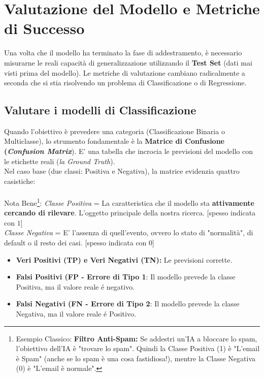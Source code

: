 \documentclass{article}
\begin{document}
\section{Valutazione del Modello e Metriche di Successo}
Una volta che il modello ha terminato la fase di addestramento, è necessario misurarne le reali capacità di generalizzazione utilizzando il \textbf{Test Set} (dati mai visti prima del modello). Le metriche di valutazione cambiano radicalmente a seconda che si stia risolvendo un problema di Classificazione o di Regressione.

\subsection{Valutare i modelli di Classificazione}
Quando l'obiettivo è prevedere una categoria (Classificazione Binaria o Multiclasse), lo strumento fondamentale è la \textbf{Matrice di Confusione (\textit{Confusion Matrix}}). E' una tabella che incrocia le previsioni del modello con le etichette reali (\textit{la Ground Truth}).\\
Nel caso base (due classi: Positiva e Negativa), la matrice evidenzia quattro casistiche: \\
\\
Nota Bene\footnote{Esempio Classico: \textbf{Filtro Anti-Spam: }Se addestri un'IA a bloccare lo spam, l'obiettivo dell'IA è "trovare lo spam". Quindi la Classe Positiva (1) è "L'email è Spam" (anche se lo spam è una cosa fastidiosa!), mentre la Classe Negativa (0) è "L'email è normale".}: \textit{Classe Positiva} = La caratteristica che il modello sta \textbf{attivamente cercando di rilevare}. L'oggetto principale della nostra ricerca. [spesso indicata con $1$] \\
    \textit{Classe Negativa} = E' l'assenza di quell'evento, ovvero lo stato di "normalità", di default o il resto dei casi. [spesso indicata con $0$]
\\
\begin{itemize}
    \item \textbf{Veri Positivi (TP) e Veri Negativi (TN):} Le previsioni corrette.

    \item \textbf{Falsi Positivi (FP - Errore di Tipo 1}: Il modello prevede la classe Positiva, ma il valore reale é negativo.

    \item \textbf{Falsi Negativi (FN - Errore di Tipo 2}: Il modello prevede la classe Negativa, ma il valore reale é Positivo.
\end{itemize}
\end{document}
